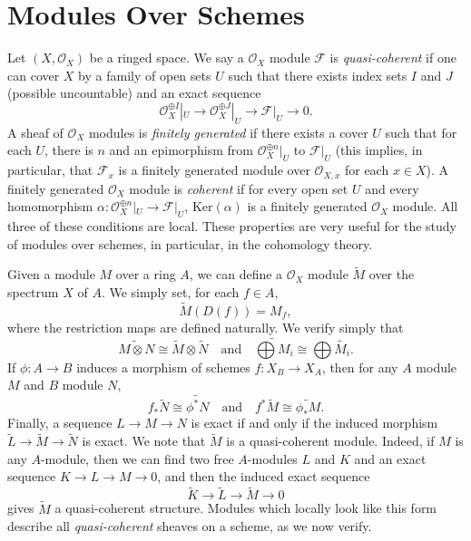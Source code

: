\section{Modules Over Schemes}

Let $(X,\mathcal{O}_X)$ be a ringed space. We say a $\mathcal{O}_X$ module $\mathcal{F}$ is \emph{quasi-coherent} if one can cover $X$ by a family of open sets $U$ such that there exists index sets $I$ and $J$ (possible uncountable) and an exact sequence
%
\[ \mathcal{O}_X^{\oplus I}|_U \to \mathcal{O}_X^{\oplus J}|_U \to \mathcal{F}|_U \to 0. \]
%
A sheaf of $\mathcal{O}_X$ modules is \emph{finitely generated} if there exists a cover $U$ such that for each $U$, there is $n$ and an epimorphism from $\mathcal{O}_X^{\oplus n}|_U$ to $\mathcal{F}|_U$ (this implies, in particular, that $\mathcal{F}_x$ is a finitely generated module over $\mathcal{O}_{X,x}$ for each $x \in X$). A finitely generated $\mathcal{O}_X$ module is \emph{coherent} if for every open set $U$ and every homomorphism $\alpha: \mathcal{O}_X^{\oplus n}|_U \to \mathcal{F}|_U$, $\text{Ker}(\alpha)$ is a finitely generated $\mathcal{O}_X$ module. All three of these conditions are local. These properties are very useful for the study of modules over schemes, in particular, in the cohomology theory.

Given a module $M$ over a ring $A$, we can define a $\mathcal{O}_X$ module $\widetilde{M}$ over the spectrum $X$ of $A$. We simply set, for each $f \in A$,
%
\[ \widetilde{M}(D(f)) = M_f, \]
%
where the restriction maps are defined naturally. We verify simply that
%
\[ \widetilde{M \otimes N} \cong \widetilde{M} \otimes \widetilde{N} \quad\text{and}\quad \widetilde{\bigoplus M_i} \cong \bigoplus \widetilde{M_i}. \]
%
If $\phi: A \to B$ induces a morphism of schemes $f: X_B \to X_A$, then for any $A$ module $M$ and $B$ module $N$,
%
\[ f_* \widetilde{N} \cong \widetilde{\phi^* N} \quad\text{and}\quad f^* \widetilde{M} \cong \widetilde{\phi_* M}. \]
%
Finally, a sequence $L \to M \to N$ is exact if and only if the induced morphism $\widetilde{L} \to \widetilde{M} \to \widetilde{N}$ is exact. We note that $\widetilde{M}$ is a quasi-coherent module. Indeed, if $M$ is any $A$-module, then we can find two free $A$-modules $L$ and $K$ and an exact sequence $K \to L \to M \to 0$, and then the induced exact sequence
%
\[ \widetilde{K} \to \widetilde{L} \to \widetilde{M} \to 0 \]
%
gives $\widetilde{M}$ a quasi-coherent structure. Modules which locally look like this form describe all \emph{quasi-coherent} sheaves on a scheme, as we now verify.

